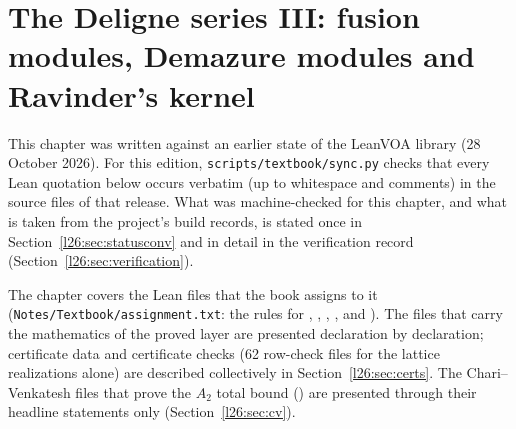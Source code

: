 \chapter[The Deligne series III: fusion modules and Ravinder's kernel]{The Deligne series III: fusion modules, Demazure modules and Ravinder's kernel}\label{ch:L26}
\begingroup\setlength{\emergencystretch}{3em}\sloppy

\providecommand{\ltwentysixg}{\mathfrak g}
\providecommand{\ltwentysixgt}{\mathfrak g[t]}
\providecommand{\ltwentysixWloc}{W_{\mathrm{loc}}}
\providecommand{\ltwentysixD}{\mathcal D}
\providecommand{\ltwentysixF}{\mathcal F}
\providecommand{\ltwentysixU}{U}
\providecommand{\ltwentysixcyc}{\operatorname{cyc}}
\providecommand{\ltwentysixHilb}{\operatorname{Hilb}}
\providecommand{\ltwentysixqb}[2]{\genfrac{[}{]}{0pt}{}{#1}{#2}_q}

This chapter was written against an earlier state of the LeanVOA library (28 October 2026).
For this edition, \texttt{scripts/textbook/sync.py} checks that every Lean quotation below occurs verbatim (up to whitespace and comments) in the source files of that release. What was machine-checked for this chapter,
and what is taken from the project's build records, is stated once in Section~\ref{l26:sec:statusconv} and in detail in the
verification record (Section~\ref{l26:sec:verification}).

The chapter covers the Lean files that the book assigns to it (\texttt{Notes/Textbook/assignment.txt}: the rules for
, , , ,  and
). The files that carry the mathematics of the proved layer are presented declaration by declaration; certificate
data and certificate checks (62 row-check files for the lattice realizations alone) are described collectively in
Section~\ref{l26:sec:certs}. The Chari--Venkatesh files that prove the $A_2$ total bound () are
presented through their headline statements only (Section~\ref{l26:sec:cv}).

